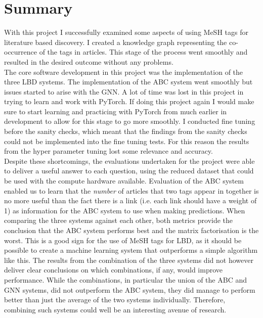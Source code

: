 \documentclass{l4proj}
\begin{document}
\section{Summary}

With this project I successfully examined some aspects of using MeSH tags for literature based discovery. I created a knowledge graph representing the co-occurrence of the tags in articles. This stage of the process went smoothly and resulted in the desired outcome without any problems. \\

The core software development in this project was the implementation of the three LBD systems. The implementation of the ABC system went smoothly but issues started to arise with the GNN. A lot of time was lost in this project in trying to learn and work with PyTorch. If doing this project again I would make sure to start learning and practicing with PyTorch from much earlier in development to allow for this stage to go more smoothly. I conducted fine tuning before the sanity checks, which meant that the findings from the sanity checks could not be implemented into the fine tuning tests. For this reason the results from the hyper parameter tuning lost some relevance and accuracy. \\

Despite these shortcomings, the evaluations undertaken for the project were able  to deliver a useful answer to each question, using the reduced dataset that could be used with the compute hardware available. Evaluation of the ABC system enabled us to learn that the \textit{number} of articles that two tags appear in together is no more useful than the fact there is a link (i.e. each link should have a weight of 1) as information for the ABC system to use when making predictions. When comparing the three systems against each other, both metrics provide the conclusion that the ABC system performs best and the matrix factorisation is the worst. This is a good sign for the use of MeSH tags for LBD, as it should be possible to create a machine learning system that outperforms a simple algorithm like this. The results from the combination of the three systems did not however deliver clear conclusions on which combinations, if any, would improve performance. While the combinations, in particular the union of the ABC and GNN systems, did not outperform the ABC system, they did manage to perform better than just the average of the two systems individually. Therefore, combining such systems could well be an interesting avenue of research. \\
\end{document}
